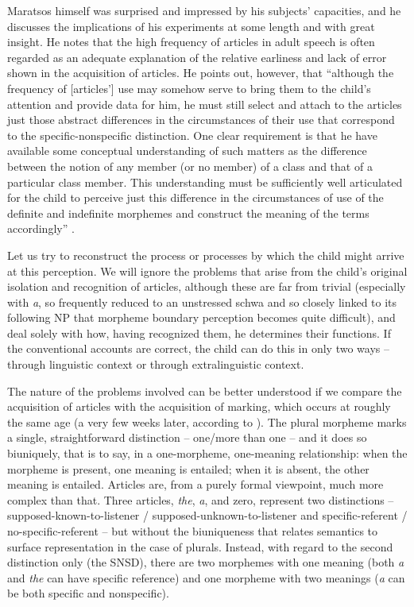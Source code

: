 Maratsos himself was surprised and impressed by his subjects' capacities, and he discusses the implications of his experiments at
some length and with great insight. He notes that the high frequency of articles in adult speech is often regarded as an adequate explanation of the relative earliness and lack of error shown in the acquisition of articles. He points out, however, that ``although the frequency of [articles'] use may somehow serve to bring them to the child's atten\-tion and provide data for him, he must still select and attach to the articles just those abstract differences in the circumstances of their use that correspond to the specific-nonspecific distinction. One clear requirement is that he have available some conceptual understanding of such matters as the difference between the notion of any member (or no member) of a class and that of a particular class member. This understanding must be sufficiently well articulated for the child to perceive just this difference in the circumstances of use of the definite and indefinite morphemes and construct the meaning of the terms accordingly'' \citep[453]{Maratsos1974}.

Let us try to reconstruct the process or processes by which the child might arrive at this perception. We will ignore the problems that arise from the child's original isolation and recognition of articles, although these are far from trivial (especially with \textit{a}, so frequently reduced to an unstressed schwa and so closely linked to its following NP that morpheme boundary perception becomes quite difficult), and deal solely with how, having recognized them, he determines their functions. If the conventional accounts are correct, the child can do this in only two ways -- through linguistic context or through extralinguistic context.

The nature of the problems involved can be better understood if we compare the acquisition of articles  with the acquisition of  marking, which occurs at roughly the same age (a very few weeks later, according to \citealt{Brown1973}). The plural morpheme marks a single, straightforward distinction -- one/more than one -- and it does so biuniquely, that is to say, in a one-morpheme, one-meaning relationship: when the morpheme is present, one meaning is entailed; when it is absent, the other meaning is entailed. Articles are, from a purely formal viewpoint, much more complex than that. Three articles, \textit{the}, \textit{a}, and
zero, represent two distinctions -- supposed-known-to-listener / supposed-unknown-to-listener and specific-referent / no-specific-referent -- but without the biuniqueness that relates semantics to surface repre\-sentation in the case of plurals. Instead, with regard to the second distinction only (the SNSD), there are two morphemes with one meaning (both \textit{a} and \textit{the} can have specific reference) and one mor\-pheme with two meanings (\textit{a} can be both specific and nonspecific).

